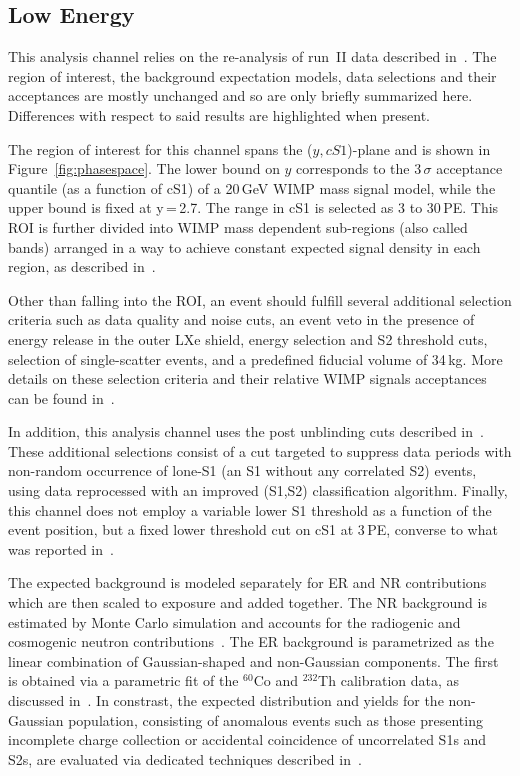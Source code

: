
\subsection{Low Energy}
\label{subsec:LowE}
This analysis channel relies on the re-analysis of run~II data described in~\cite{xe100_run_combination}. The region of interest, the background 
expectation models, data selections and their acceptances are mostly unchanged and so are only briefly summarized here. Differences with respect to said results are highlighted when present.

The region of interest for this channel spans the ($y,cS1$)-plane and is shown in Figure~\ref{fig:phasespace}.  The lower 
bound on $y$ corresponds to the 3\,$\sigma$ acceptance quantile (as a function of cS1) of a 20\,GeV WIMP mass signal model, while the upper bound is fixed at y\,=\,2.7.
The range in cS1 is selected as 3 to 30\,PE. This ROI is further divided into WIMP mass dependent sub-regions (also called bands) arranged in a way to achieve constant expected signal density in each region, as described in~\cite{xe100_run_combination}.

Other than falling into the ROI, an event should fulfill several additional selection criteria such as data quality and noise cuts,
an event veto in the presence of energy release in the outer LXe shield, energy selection and S2 threshold cuts,
selection of single-scatter events, and a predefined fiducial volume of 34\,kg. More details on these selection criteria and their 
relative WIMP signals acceptances can be found in~\cite{Aprile:2012vw,xe100_run_combination}. 

In addition, this analysis channel uses the post unblinding cuts described in~\cite{xe100_run_combination}. 
These additional selections consist of a cut targeted to suppress data periods with non-random occurrence of lone-S1 (an S1 without 
any correlated S2) events, using data reprocessed with an improved (S1,S2) classification algorithm.
Finally, this channel does not employ a variable lower S1 threshold as a function of the event position, but a fixed 
lower threshold cut on cS1 at 3\,PE, converse to what was reported in~\cite{xe100_run_combination}.

The expected background is modeled separately for ER and NR contributions which are then scaled to exposure and added together.
The NR background is estimated by Monte Carlo simulation and accounts for the radiogenic and cosmogenic neutron
contributions~\cite{Aprile:2013tov}.
The ER background is parametrized as the linear combination of Gaussian-shaped and non-Gaussian components.
The first is obtained via a parametric fit of the $^{60}$Co and $^{232}$Th calibration data, as discussed in~\cite{xe100_run10_si}.
In constrast, the expected distribution and yields for the non-Gaussian population, consisting of anomalous events such as those 
presenting incomplete charge collection or accidental coincidence of uncorrelated S1s and S2s,  
are evaluated via dedicated techniques described in~\cite{xe100_run_combination}.

